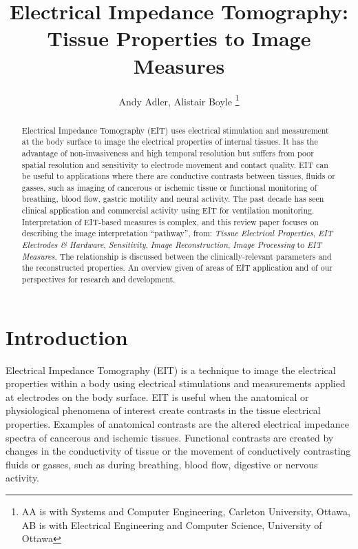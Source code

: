 \documentclass[10pt,journal]{IEEEtran}\def\TBLWIDA{15mm}\def\TBLWIDB{60mm}
\begin{document}
\title{Electrical Impedance Tomography:\\ Tissue Properties to Image Measures}
\author{Andy Adler, Alistair Boyle
\thanks{AA is with Systems and Computer Engineering, Carleton University, Ottawa, AB is with Electrical Engineering and Computer Science, University of Ottawa}
}
\date{}
\maketitle

\begin{abstract}
Electrical Impedance Tomography (EIT) uses electrical
stimulation and measurement at the body surface to
image the electrical properties of internal tissues.
It has the advantage of non-invasiveness and
high temporal resolution but suffers from poor spatial
resolution and sensitivity to electrode movement and
contact quality.
EIT can be useful to applications where there are conductive contrasts between
tissues, fluids or gasses, such as imaging of cancerous
or ischemic tissue or functional monitoring
of breathing, blood flow, gastric motility
and neural activity.
The past decade has seen clinical application and commercial
activity using EIT for ventilation monitoring.
Interpretation of EIT-based measures is complex, and
this review paper focuses on 
describing the image interpretation ``pathway'', from:
{\em Tissue Electrical Properties},
{\em EIT Electrodes \& Hardware},
{\em Sensitivity},
{\em Image Reconstruction},
{\em Image Processing}
to 
{\em EIT Measures}.
The relationship is discussed between the 
clinically-relevant parameters and the 
reconstructed properties.
An overview given of areas of EIT application 
and of our perspectives for
research and development.
\end{abstract}


\section{Introduction}

Electrical Impedance Tomography (EIT) is a technique to 
image the electrical properties within a body using
electrical stimulations and measurements applied at electrodes
on the body surface.
EIT is useful when the
anatomical or physiological phenomena of interest
create contrasts in the tissue electrical properties.
Examples of anatomical contrasts are 
the altered electrical impedance spectra of
cancerous \cite{Jossinet1998Breast} and
ischemic \cite{Packham2012Frequency} tissues.
Functional contrasts are created by changes
in the conductivity of tissue or the movement of
conductively contrasting fluids or gasses, such as during
breathing, blood flow, digestive or nervous activity.
\end{document}
